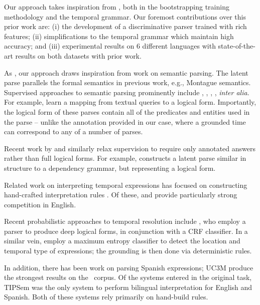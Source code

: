 Our approach takes inspiration from \me, both in the bootstrapping training
  methodology and the temporal grammar.
Our foremost contributions over this prior work are:
  (i) the development of a discriminative parser trained with rich features;
  (ii) simplifications to the temporal grammar which maintain high accuracy;
  and
  (iii) experimental results on 6 different languages with state-of-the-art
        results on both datasets with prior work.

As \me, our approach draws inspiration from work on semantic parsing.
The latent parse parallels the formal semantics in previous work,
	e.g., Montague semantics.
Supervised approaches to semantic parsing prominently include
	,
	,
	, 
	, 
	\textit{inter alia}.
For example,  learn a mapping from
	textual queries to a logical form.
Importantly, the logical form of these parses contain all of the predicates
  and entities used in the parse -- unlike the annotation provided in our case,
  where a grounded time can correspond to any of a number of parses.

Recent work by  and 
	 similarly relax supervision 
	to require only annotated answers rather than full logical forms.
For example,  constructs a latent parse
	similar in structure to a dependency grammar, but representing a logical
	form.

Related work on interpreting temporal expressions has focused on constructing
	hand-crafted interpretation rules
	\cite{key:2000mani-temporal,key:2003saquete-temporal,key:2004puscasu-temporal,key:2010grover-temporal}.  
Of these,  \cite{key:2010strotgen-temporal} and
	 \cite{key:2012chang-temporal} provide particularly strong
	competition in English.

Recent probabilistic approaches to temporal resolution include
	,    %
	who employ a parser to produce deep logical forms, in conjunction with
	a CRF classifier.
In a similar vein,
	employ a maximum entropy classifier to detect the location and temporal
	type of expressions; the grounding is then done via deterministic rules.
	
In addition, there has been work on parsing Spanish expressions;
  UC3M \cite{2010vicente-uc3m} produce the strongest results on the
  \tempeval\ corpus.
Of the systems entered in the original task,
  TIPSem \cite{key:2010llorens-tipsem} was the only system to perform bilingual
  interpretation for English and Spanish.
Both of these systems rely primarily on hand-build rules.



